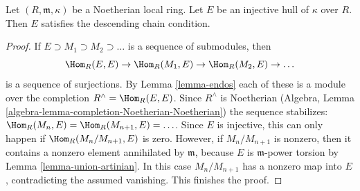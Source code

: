 \begin{lemma}
\label{lemma-injective-hull-has-dcc}
Let $(R, \mathfrak m, \kappa)$ be a Noetherian local ring.
Let $E$ be an injective hull of $\kappa$ over $R$. Then
$E$ satisfies the descending chain condition.
\end{lemma}

\begin{proof}
If $E \supset M_1 \supset M_2 \supset \ldots$ is a sequence of submodules, then
$$
\Hom_R(E, E) \to \Hom_R(M_1, E) \to \Hom_R(M_2, E) \to \ldots
$$
is a sequence of surjections. By Lemma \ref{lemma-endos} each of these is a
module over the completion $R^\wedge = \Hom_R(E, E)$.
Since $R^\wedge$ is Noetherian
(Algebra, Lemma \ref{algebra-lemma-completion-Noetherian-Noetherian})
the sequence stabilizes: $\Hom_R(M_n, E) = \Hom_R(M_{n + 1}, E) = \ldots$.
Since $E$ is injective, this can only happen if $\Hom_R(M_n/M_{n + 1}, E)$
is zero. However, if $M_n/M_{n + 1}$ is nonzero, then it contains a
nonzero element annihilated by $\mathfrak m$, because $E$ is
$\mathfrak m$-power torsion by Lemma \ref{lemma-union-artinian}.
In this case $M_n/M_{n + 1}$ has a nonzero map into $E$, contradicting
the assumed vanishing. This finishes the proof.
\end{proof}
